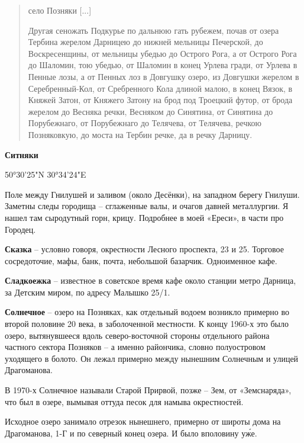 \begin{quotation}
село Позняки [...]

Другая сеножать Подкурье по дальнюю гать рубежем, почав от озера Тербина жерелом Дарницею до нижней мельницы Печерской, до Воскресенщины, от мельницы убедью до Ост\-рого Рога, а от Острого Рога до Шаломин, тою убедью, от Шаломин в конец Урлева гради, от Урлева в Пенные лозы, а от Пенных лоз в Довгушку озеро, из Довгушки жерелом в Серебренный-Кол, от Сребренного Кола длиной малою, в конец Вязок, в Княжей Затон, от Княжего Затону на брод под Троецкий футор, от брода жерелом до Весняка речки, Весняком до Синятина, от Синятина до Порубежнаго, от Порубежнаго до Телячева, от Телячева, речкою Позняковкую, до моста на Тербин речке, да в речку Дарницу.
\end{quotation}

\medskip

\textbf{Ситняки} 

50°30'25"N 30°34'24"E

Поле между Гнилушей и заливом (около Десёнки), на западном берегу Гнилуши. Заметны следы городища – сглаженные валы, и очагов давней металлургии. Я нашел там сыродутный горн, крицу. Подробнее в моей «Ереси», в части про Городец.\\

\medskip

\textbf{Сказка} – условно говоря, окрестности Лесного проспекта, 23 и 25. Торговое сосредоточие, мафы, банк, почта, небольшой базарчик. Одноименное кафе.\\

\medskip

\textbf{Сладкоежка} – известное в советское время кафе около станции метро Дарница, за Детским миром, по адресу Малышко 25/1.\\

\medskip

\textbf{Солнечное} – озеро на Позняках, как отдельный водоем возникло примерно во второй половине 20 века, в заболоченной местности. К концу 1960-х это было озеро, вытянувшееся вдоль северо-восточной стороны отдельного района частного сектора Позняков – а именно райончика, словно полуостровом уходящего в болото. Он лежал примерно между нынешним Солнечным и улицей Драгоманова.

В 1970-х Солнечное называли Старой Прирвой, позже – Зем, от «Земснаряда», что был в озере, вымывая оттуда песок для намыва окрестностей.

Исходное озеро занимало отрезок нынешнего, примерно от широты дома на Драгоманова, 1-Г и по северный конец озера. И было вполовину у\'же.\\

